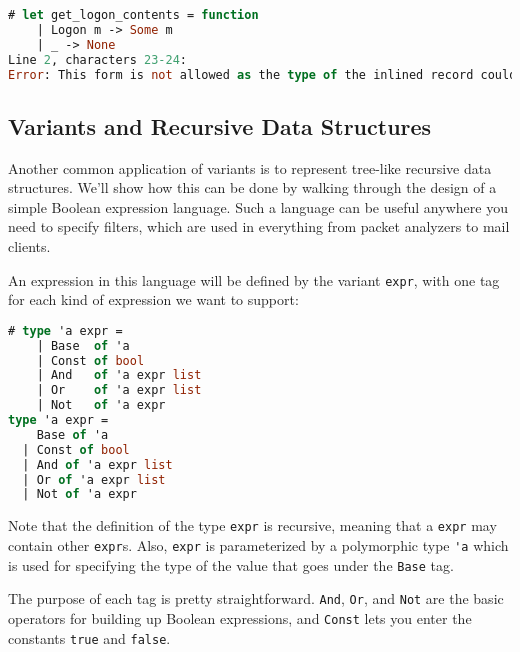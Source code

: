\begin{lstlisting}[language=Caml]
# let get_logon_contents = function
    | Logon m -> Some m
    | _ -> None
Line 2, characters 23-24:
Error: This form is not allowed as the type of the inlined record could escape.
\end{lstlisting}

\hypertarget{variants-and-recursive-data-structures}{%
\subsection{Variants and Recursive Data
Structures}\label{variants-and-recursive-data-structures}}

Another common application of variants is to represent tree-like
recursive data structures. We'll show how this can be done by walking
through the design of a simple Boolean expression language. Such a
language can be useful anywhere you need to specify filters, which are
used in everything from packet analyzers to mail clients.

An expression in this language will be defined by the variant
\passthrough{\lstinline!expr!}, with one tag for each kind of expression
we want to support:

\begin{lstlisting}[language=Caml]
# type 'a expr =
    | Base  of 'a
    | Const of bool
    | And   of 'a expr list
    | Or    of 'a expr list
    | Not   of 'a expr
type 'a expr =
    Base of 'a
  | Const of bool
  | And of 'a expr list
  | Or of 'a expr list
  | Not of 'a expr
\end{lstlisting}

Note that the definition of the type \passthrough{\lstinline!expr!} is
recursive, meaning that a \passthrough{\lstinline!expr!} may contain
other \passthrough{\lstinline!expr!}s. Also,
\passthrough{\lstinline!expr!} is parameterized by a polymorphic type
\passthrough{\lstinline!'a!} which is used for specifying the type of
the value that goes under the \passthrough{\lstinline!Base!} tag.

The purpose of each tag is pretty straightforward.
\passthrough{\lstinline!And!}, \passthrough{\lstinline!Or!}, and
\passthrough{\lstinline!Not!} are the basic operators for building up
Boolean expressions, and \passthrough{\lstinline!Const!} lets you enter
the constants \passthrough{\lstinline!true!} and
\passthrough{\lstinline!false!}.

